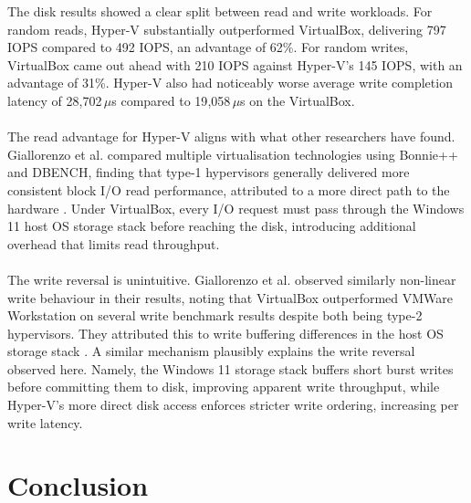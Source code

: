 \documentclass[a4paper, 12pt]{article}
\theoremstyle{plain}
\theoremstyle{definition}
\theoremstyle{remark}
\begin{document}
    The disk results showed a clear split between read and write workloads. For random 
    reads, Hyper-V substantially outperformed VirtualBox, delivering 797 IOPS compared 
    to 492 IOPS, an advantage of 62\%. For random writes, VirtualBox came out ahead with 
    210 IOPS against Hyper-V's 145 IOPS, with an advantage of 31\%. Hyper-V also had noticeably worse 
    average write completion latency of 28{,}702\,$\mu$s compared to 19{,}058\,$\mu$s on the VirtualBox.\\
    \\
    \noindent The read advantage for Hyper-V aligns with what other researchers have 
    found. Giallorenzo et al. compared multiple virtualisation technologies using 
    Bonnie++ and DBENCH, finding that type-1 hypervisors generally delivered more 
    consistent block I/O read performance, attributed to a more direct path to the 
    hardware \parencite{giallorenzoVirtualizationCostsBenchmarking2021}. Under VirtualBox, 
    every I/O request must pass through the Windows 11 host OS storage stack before 
    reaching the disk, introducing additional overhead that limits read throughput.\\
    \\
    \noindent The write reversal is unintuitive. Giallorenzo et al. observed 
    similarly non-linear write behaviour in their results, noting that VirtualBox 
    outperformed VMWare Workstation on several write benchmark results despite both 
    being type-2 hypervisors. They attributed this to write buffering differences in 
    the host OS storage stack \parencite{giallorenzoVirtualizationCostsBenchmarking2021}. 
    A similar mechanism plausibly explains the write reversal observed here. Namely, the 
    Windows 11 storage stack buffers short burst writes before committing them to 
    disk, improving apparent write throughput, while Hyper-V's more direct disk 
    access enforces stricter write ordering, increasing per write latency.

    \section{Conclusion}
\end{document}
